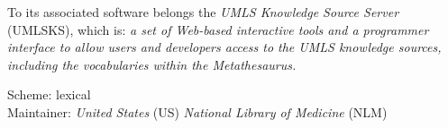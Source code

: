 To its associated software belongs the \emph{UMLS Knowledge Source Server}
(UMLSKS), which is: \textit{a set of Web-based interactive tools and a
programmer interface to allow users and developers access to the UMLS knowledge
sources, including the vocabularies within the Metathesaurus.} \cite{umls}

Scheme: lexical\\
Maintainer: \emph{United States} (US) \emph{National Library of Medicine} (NLM)
